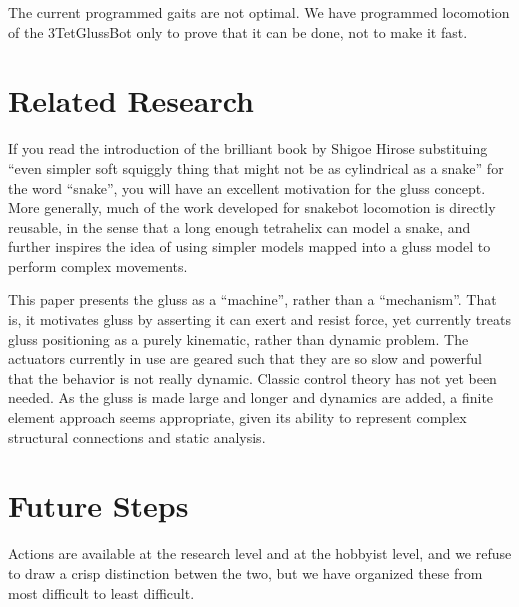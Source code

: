 \documentclass[11pt]{article}
\begin{document}
The current programmed gaits are not optimal.
We have programmed locomotion of the 3TetGlussBot only to prove that it can be done, not to make
it fast.

\section{Related Research}

If you read the introduction of the brilliant book by Shigoe Hirose\cite{hirose1993biologically} substituing
``even simpler soft squiggly thing that might not be as cylindrical as a snake'' for the word ``snake'', you will have
an excellent motivation for the gluss concept.  More generally, much of the work developed for snakebot
locomotion\cite{liljebäck2012snake} is directly reusable, in the sense that a long enough tetrahelix can
model a snake, and further inspires the idea of using simpler models mapped into a gluss model to perform
complex movements.

This paper presents the gluss as a ``machine'', rather than a ``mechanism''. That is, it motivates gluss
by asserting it can exert and resist force, yet currently treats gluss positioning as a purely kinematic,
rather than dynamic problem. The actuators currently in use are geared such that they are so slow
and powerful that the behavior is not really dynamic. Classic control theory has not yet been needed.
As the gluss is made large and longer and dynamics are added,
a finite element approach\cite{géradin2001flexible} seems appropriate,
given its ability to represent complex structural connections and static analysis.

\section{Future Steps}

Actions are available at the research level and at the hobbyist level, and we refuse to draw
a crisp distinction betwen the two, but we have organized these from most difficult to least
difficult.
\end{document}
